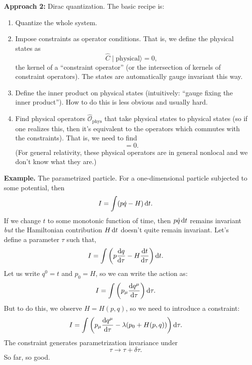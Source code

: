 \bigbreak
\textbf{Approach 2:} Dirac quantization. The basic recipe is:
\begin{enumerate}[nosep,label=(\arabic*)]
\item Quantize the whole system.
\item Impose constraints as operator conditions. That is, we define the
  physical states as
  \begin{equation}
\widehat{C}\mid\mbox{physical}\rangle = 0,
  \end{equation}
  the kernel of a ``constraint operator'' (or the intersection of
  kernels of constraint operators). The states are automatically gauge
  invariant this way.
\item Define the inner product on physical states (intuitively: ``gauge
  fixing the inner product''). How to do this is less obvious and usually hard.
\item Find physical operators $\widehat{\mathcal{O}}_{\text{phys}}$ that take physical states to physical
  states (so if one realizes this, then it's equivalent to the operators
  which commutes with the constraints). That is, we need to find
  \begin{equation}
[\widehat{\mathcal{O}}_{\text{phys}},\widehat{C}]=0.
  \end{equation}
(For general relativity, these physical operators are in general
  nonlocal and we don't know what they are.)
\end{enumerate}

\bigbreak\noindent\textbf{Example.}
The parametrized particle. For a one-dimensional particle subjected to
some potential, then
\begin{equation}
I = \int(p\dot{q} - H)\,\mathrm{d} t.
\end{equation}
If we change $t$ to some monotonic function of time, then $p\dot{q}\,\mathrm{d} t$
remains invariant \emph{but} the Hamiltonian contribution $H\,\mathrm{d} t$
doesn't quite remain invariant. Let's define a parameter $\tau$ such
that,
\begin{equation}
I = \int\left(p\frac{\mathrm{d} q}{\mathrm{d} \tau} - H\frac{\mathrm{d} t}{\mathrm{d}\tau}\right)\mathrm{d} t.
\end{equation}
Let us write $q^{0}=t$ and $p_{0}=H$, so we can write the action as:
\begin{equation}
I = \int\left(p_{\mu}\frac{\mathrm{d} q^{\mu}}{\mathrm{d}\tau}\right)\mathrm{d}\tau.
\end{equation}
But to do this, we observe $H=H(p,q)$, so we need to introduce a
constraint:
\begin{equation}
I = \int\left(p_{\mu}\frac{\mathrm{d} q^{\mu}}{\mathrm{d}\tau} - \lambda(p_{0}+H(p,q))\right)\mathrm{d}\tau.
\end{equation}
The constraint generates parametrization invariance under
\begin{equation}
\tau\to\tau+\delta\tau.
\end{equation}
So far, so good.

